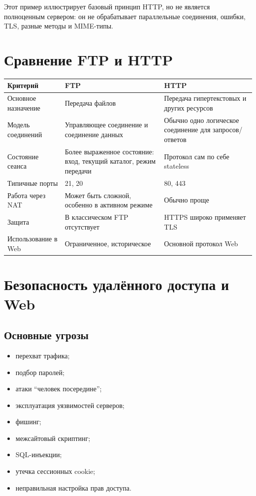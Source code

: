 \documentclass[12pt,a4paper]{article}
\begin{document}
Этот пример иллюстрирует базовый принцип HTTP, но не является полноценным сервером: он не обрабатывает параллельные соединения, ошибки, TLS, разные методы и MIME-типы.

\section{Сравнение FTP и HTTP}

\begin{center}
\begin{tabular}{|p{4cm}|p{5cm}|p{5cm}|}
\hline
Критерий & FTP & HTTP \\
\hline
Основное назначение & Передача файлов & Передача гипертекстовых и других ресурсов \\
\hline
Модель соединений & Управляющее соединение и соединение данных & Обычно одно логическое соединение для запросов/ответов \\
\hline
Состояние сеанса & Более выраженное состояние: вход, текущий каталог, режим передачи & Протокол сам по себе stateless \\
\hline
Типичные порты & 21, 20 & 80, 443 \\
\hline
Работа через NAT & Может быть сложной, особенно в активном режиме & Обычно проще \\
\hline
Защита & В классическом FTP отсутствует & HTTPS широко применяет TLS \\
\hline
Использование в Web & Ограниченное, историческое & Основной протокол Web \\
\hline
\end{tabular}
\end{center}

\section{Безопасность удалённого доступа и Web}

\subsection{Основные угрозы}

\begin{itemize}
    \item перехват трафика;
    \item подбор паролей;
    \item атаки ``человек посередине'';
    \item эксплуатация уязвимостей серверов;
    \item фишинг;
    \item межсайтовый скриптинг;
    \item SQL-инъекции;
    \item утечка сессионных cookie;
    \item неправильная настройка прав доступа.
\end{itemize}
\end{document}
